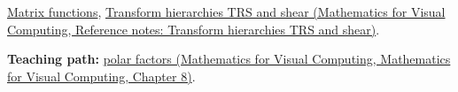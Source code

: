\hyperref[appendix-0f4bc2bf2b1f]{Matrix functions}, \href{../02-Mathematics-for-Visual-Computing/main.pdf\#nameddest=appendix-292c061cd47c}{Transform hierarchies TRS and shear (Mathematics for Visual Computing, Reference notes: Transform hierarchies TRS and shear)}.

\textbf{Teaching path:} \href{../02-Mathematics-for-Visual-Computing/main.pdf\#nameddest=02-foundations-ii-ch024-polar-decomposition-separates-rotation-like-motion-from-stretch}{polar factors (Mathematics for Visual Computing, Mathematics for Visual Computing, Chapter 8)}.
